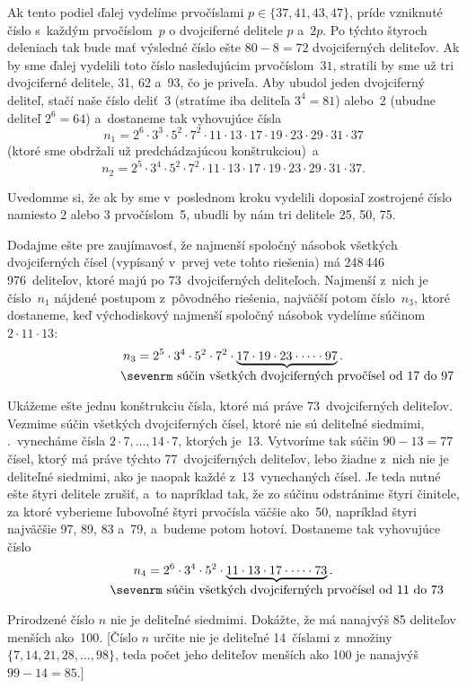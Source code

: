{Ak tento podiel ďalej vydelíme prvočíslami $p\in\{37, 41, 43, 47\}$, príde
vzniknuté číslo s~každým prvočíslom~$p$ o dvojciferné delitele $p$
a~$2p$. Po týchto štyroch deleniach tak bude mať výsledné číslo ešte
$80-8=72$ dvojciferných deliteľov. Ak
by sme ďalej vydelili toto číslo nasledujúcim prvočíslom~$31$,
stratili by sme už tri dvojciferné delitele, 31, 62 a~93, čo je priveľa.
Aby ubudol jeden dvojciferný deliteľ, stačí naše číslo deliť~3 (stratíme
iba deliteľa $3^4=81$) alebo~2 (ubudne deliteľ $2^6=64$) a~dostaneme tak
vyhovujúce čísla
$$
n_1=2^6\cdot3^3\cdot5^2\cdot7^2\cdot11\cdot13\cdot17\cdot19\cdot23\cdot29\cdot31\cdot37
$$
(ktoré sme obdržali už predchádzajúcou konštrukciou)~a\relax
$$
n_2=2^5\cdot3^4\cdot5^2\cdot7^2\cdot11\cdot13\cdot17\cdot19\cdot23\cdot29\cdot31\cdot37.
$$

Uvedomme si, že ak by sme v~poslednom kroku vydelili doposiaľ zostrojené číslo
namiesto 2 alebo 3 prvočíslom~5, ubudli by nám tri delitele 25, 50, 75.

Dodajme ešte pre zaujímavosť, že najmenší spoločný násobok všetkých
dvojciferných čísel (vypísaný v~prvej vete tohto riešenia) má
248\,446\,976~deliteľov, ktoré majú po 73~dvojciferných deliteľoch.
Najmenší z~nich je číslo~$n_1$ nájdené postupom z~pôvodného riešenia,
najväčší potom číslo~$n_3$, ktoré dostaneme, keď východiskový najmenší spoločný
násobok vydelíme súčinom $2\cdot11\cdot13$:
$$
n_3=2^5\cdot3^4\cdot5^2\cdot7^2\cdot\underbrace{17\cdot19\cdot23\cdot\dots\cdot97}_{\setbox0=\hbox{\sevenrm súčin všetkých dvojciferných prvočísel od 17 do 97}\wd0=0pt\box0}.
$$

\ineres
Ukážeme ešte jednu konštrukciu čísla, ktoré má práve 73~dvojciferných deliteľov.
Vezmime súčin všetkých dvojciferných čísel, ktoré nie sú deliteľné siedmimi,
\tj.~vynecháme čísla $2\cdot 7, \dots, 14\cdot 7$, ktorých je~13.
Vytvoríme tak súčin $90-13=77$ čísel, ktorý má práve týchto
77~dvojciferných deliteľov, lebo žiadne z~nich nie je deliteľné siedmimi, ako je
naopak každé z~13~vynechaných čísel. Je teda nutné ešte štyri
delitele zrušiť, a~to napríklad tak, že zo súčinu odstránime štyri
činitele, za ktoré vyberieme ľubovoľné štyri prvočísla väčšie ako~50,
napríklad štyri najväčšie 97, 89, 83 a~79, a~budeme potom hotoví.
Dostaneme tak vyhovujúce číslo
$$
n_4=2^6\cdot3^4\cdot5^2\cdot\underbrace{11\cdot13\cdot17\cdot\dots\cdot73}_{\setbox0=\hbox{\sevenrm súčin všetkých dvojciferných prvočísel od 11 do 73}\wd0=0pt\box0}.
$$


Prirodzené číslo $n$ nie je deliteľné siedmimi. Dokážte, že má nanajvýš 85
deliteľov menších ako~100. [Číslo $n$ určite nie je deliteľné 14~číslami
z~množiny $\{7,14,21,28,\dots,98\}$, teda počet jeho deliteľov menších
ako 100 je nanajvýš $99-14=85$.]

}
